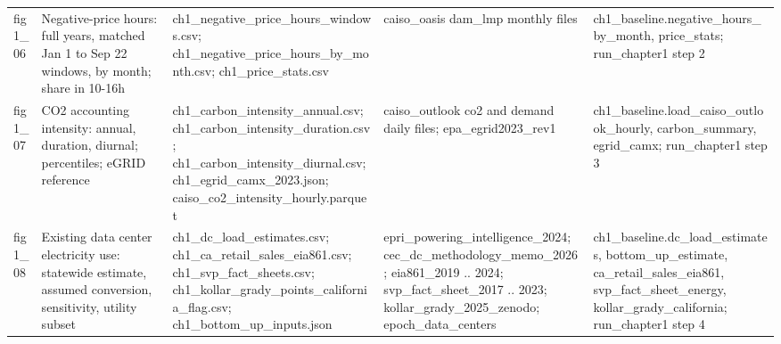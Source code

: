 \begin{tabular}{lp{4.6cm}p{5.2cm}p{4.6cm}p{4.8cm}}
fig1\_\allowbreak{}06 & Negative-price hours: full years, matched Jan 1 to Sep 22 windows, by month; share in 10-16h & ch1\_\allowbreak{}negative\_\allowbreak{}price\_\allowbreak{}hours\_\allowbreak{}windows.csv; ch1\_\allowbreak{}negative\_\allowbreak{}price\_\allowbreak{}hours\_\allowbreak{}by\_\allowbreak{}month.csv; ch1\_\allowbreak{}price\_\allowbreak{}stats.csv & caiso\_\allowbreak{}oasis dam\_\allowbreak{}lmp monthly files & ch1\_\allowbreak{}baseline.negative\_\allowbreak{}hours\_\allowbreak{}by\_\allowbreak{}month, price\_\allowbreak{}stats; run\_\allowbreak{}chapter1 step 2 \\
fig1\_\allowbreak{}07 & CO2 accounting intensity: annual, duration, diurnal; percentiles; eGRID reference & ch1\_\allowbreak{}carbon\_\allowbreak{}intensity\_\allowbreak{}annual.csv; ch1\_\allowbreak{}carbon\_\allowbreak{}intensity\_\allowbreak{}duration.csv; ch1\_\allowbreak{}carbon\_\allowbreak{}intensity\_\allowbreak{}diurnal.csv; ch1\_\allowbreak{}egrid\_\allowbreak{}camx\_\allowbreak{}2023.json; caiso\_\allowbreak{}co2\_\allowbreak{}intensity\_\allowbreak{}hourly.parquet & caiso\_\allowbreak{}outlook co2 and demand daily files; epa\_\allowbreak{}egrid2023\_\allowbreak{}rev1 & ch1\_\allowbreak{}baseline.load\_\allowbreak{}caiso\_\allowbreak{}outlook\_\allowbreak{}hourly, carbon\_\allowbreak{}summary, egrid\_\allowbreak{}camx; run\_\allowbreak{}chapter1 step 3 \\
fig1\_\allowbreak{}08 & Existing data center electricity use: statewide estimate, assumed conversion, sensitivity, utility subset & ch1\_\allowbreak{}dc\_\allowbreak{}load\_\allowbreak{}estimates.csv; ch1\_\allowbreak{}ca\_\allowbreak{}retail\_\allowbreak{}sales\_\allowbreak{}eia861.csv; ch1\_\allowbreak{}svp\_\allowbreak{}fact\_\allowbreak{}sheets.csv; ch1\_\allowbreak{}kollar\_\allowbreak{}grady\_\allowbreak{}points\_\allowbreak{}california\_\allowbreak{}flag.csv; ch1\_\allowbreak{}bottom\_\allowbreak{}up\_\allowbreak{}inputs.json & epri\_\allowbreak{}powering\_\allowbreak{}intelligence\_\allowbreak{}2024; cec\_\allowbreak{}dc\_\allowbreak{}methodology\_\allowbreak{}memo\_\allowbreak{}2026; eia861\_\allowbreak{}2019 .. 2024; svp\_\allowbreak{}fact\_\allowbreak{}sheet\_\allowbreak{}2017 .. 2023; kollar\_\allowbreak{}grady\_\allowbreak{}2025\_\allowbreak{}zenodo; epoch\_\allowbreak{}data\_\allowbreak{}centers & ch1\_\allowbreak{}baseline.dc\_\allowbreak{}load\_\allowbreak{}estimates, bottom\_\allowbreak{}up\_\allowbreak{}estimate, ca\_\allowbreak{}retail\_\allowbreak{}sales\_\allowbreak{}eia861, svp\_\allowbreak{}fact\_\allowbreak{}sheet\_\allowbreak{}energy, kollar\_\allowbreak{}grady\_\allowbreak{}california; run\_\allowbreak{}chapter1 step 4 \\

\end{tabular}
